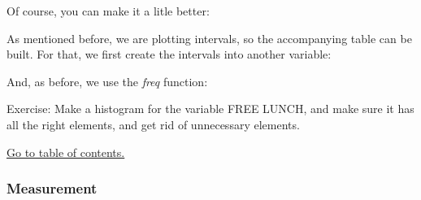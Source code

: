 \documentclass[]{article}
\newenvironment{Shaded}{\begin{snugshade}}{\end{snugshade}}
\newcommand{\KeywordTok}[1]{\textcolor[rgb]{0.13,0.29,0.53}{\textbf{#1}}}
\newcommand{\DataTypeTok}[1]{\textcolor[rgb]{0.13,0.29,0.53}{#1}}
\newcommand{\DecValTok}[1]{\textcolor[rgb]{0.00,0.00,0.81}{#1}}
\newcommand{\StringTok}[1]{\textcolor[rgb]{0.31,0.60,0.02}{#1}}
\newcommand{\CommentTok}[1]{\textcolor[rgb]{0.56,0.35,0.01}{\textit{#1}}}
\newcommand{\OperatorTok}[1]{\textcolor[rgb]{0.81,0.36,0.00}{\textbf{#1}}}
\newcommand{\NormalTok}[1]{#1}
\begin{document}
Of course, you can make it a litle better:

\begin{Shaded}
\end{Shaded}

As mentioned before, we are plotting intervals, so the accompanying
table can be built. For that, we first create the intervals into another
variable:

\begin{Shaded}
\end{Shaded}

And, as before, we use the \emph{freq} function:

\begin{Shaded}
\end{Shaded}

{ Exercise: Make a histogram for the variable FREE LUNCH, and make sure
it has all the right elements, and get rid of unnecessary elements. }

\protect\hyperlink{part1}{Go to table of contents.}

\subsubsection{Measurement}\label{measurement}
\end{document}
